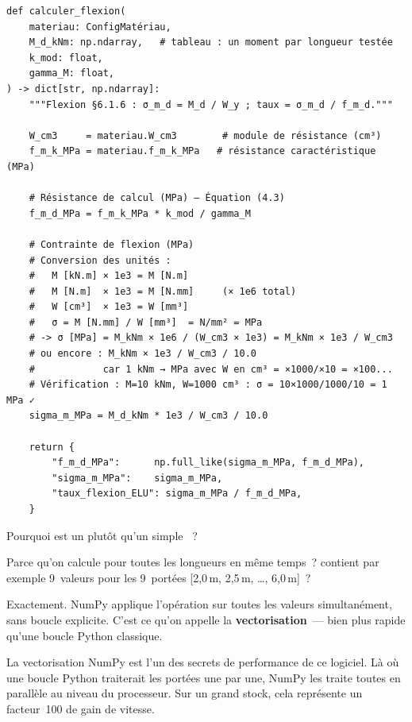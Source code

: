 \begin{lstlisting}[style=python, caption={\fichier{ec5/elu.py} --- fonction \py{calculer\_flexion()}}]
def calculer_flexion(
    materiau: ConfigMatériau,
    M_d_kNm: np.ndarray,   # tableau : un moment par longueur testée
    k_mod: float,
    gamma_M: float,
) -> dict[str, np.ndarray]:
    """Flexion §6.1.6 : σ_m_d = M_d / W_y ; taux = σ_m_d / f_m_d."""

    W_cm3     = materiau.W_cm3        # module de résistance (cm³)
    f_m_k_MPa = materiau.f_m_k_MPa   # résistance caractéristique (MPa)

    # Résistance de calcul (MPa) — Équation (4.3)
    f_m_d_MPa = f_m_k_MPa * k_mod / gamma_M

    # Contrainte de flexion (MPa)
    # Conversion des unités :
    #   M [kN.m] × 1e3 = M [N.m]
    #   M [N.m]  × 1e3 = M [N.mm]     (× 1e6 total)
    #   W [cm³]  × 1e3 = W [mm³]
    #   σ = M [N.mm] / W [mm³]  = N/mm² = MPa
    # -> σ [MPa] = M_kNm × 1e6 / (W_cm3 × 1e3) = M_kNm × 1e3 / W_cm3
    # ou encore : M_kNm × 1e3 / W_cm3 / 10.0
    #            car 1 kNm → MPa avec W en cm³ = ×1000/×10 = ×100...
    # Vérification : M=10 kNm, W=1000 cm³ : σ = 10×1000/1000/10 = 1 MPa ✓
    sigma_m_MPa = M_d_kNm * 1e3 / W_cm3 / 10.0

    return {
        "f_m_d_MPa":      np.full_like(sigma_m_MPa, f_m_d_MPa),
        "sigma_m_MPa":    sigma_m_MPa,
        "taux_flexion_ELU": sigma_m_MPa / f_m_d_MPa,
    }
\end{lstlisting}

\begin{maitre}
Pourquoi  est un  plut\^ot qu'un simple ~?
\end{maitre}

\begin{apprenti}
Parce qu'on calcule pour toutes les longueurs en m\^eme temps~?
 contient par exemple 9~valeurs pour les 9~port\'ees
[2,0\,m, 2,5\,m, \ldots, 6,0\,m]~?
\end{apprenti}

\begin{maitre}
Exactement. NumPy applique l'op\'eration 
sur toutes les valeurs simultan\'ement, sans boucle explicite.
C'est ce qu'on appelle la \textbf{vectorisation}~--- bien plus rapide
qu'une boucle Python classique.
\end{maitre}

\begin{important}
La vectorisation NumPy est l'un des secrets de performance de ce logiciel.
L\`a o\`u une boucle Python traiterait les port\'ees une par une,
NumPy les traite toutes en parall\`ele au niveau du processeur.
Sur un grand stock, cela repr\'esente un facteur~100 de gain de vitesse.
\end{important}

